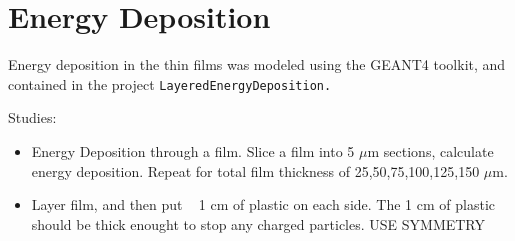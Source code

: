 \section{Energy Deposition}

Energy deposition in the thin films was modeled using the GEANT4 toolkit, and contained in the project \tt{LayeredEnergyDeposition}.


Studies:
\begin{itemize}
    \item Energy Deposition through a film. Slice a film into 5 $\mu$m sections, calculate energy deposition. Repeat for total film thickness of 25,50,75,100,125,150 $\mu$m.
    \item Layer film, and then put ~ 1 cm of plastic on each side. The 1 cm of plastic should be thick enought to stop any charged particles. USE SYMMETRY
\end{itemize}

